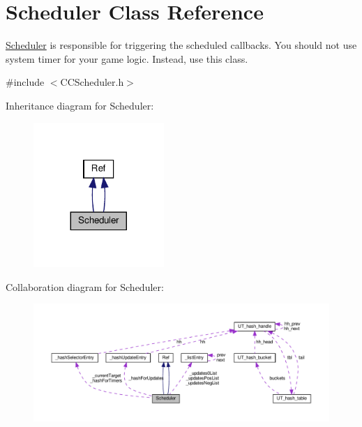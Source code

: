 \hypertarget{classScheduler}{}\section{Scheduler Class Reference}
\label{classScheduler}


\hyperlink{classScheduler}{Scheduler} is responsible for triggering the scheduled callbacks. You should not use system timer for your game logic. Instead, use this class.  




{\ttfamily \#include $<$C\+C\+Scheduler.\+h$>$}



Inheritance diagram for Scheduler\+:
\nopagebreak
\begin{figure}[H]
\begin{center}
\leavevmode
\includegraphics[width=140pt]{classScheduler__inherit__graph}
\end{center}
\end{figure}


Collaboration diagram for Scheduler\+:
\nopagebreak
\begin{figure}[H]
\begin{center}
\leavevmode
\includegraphics[width=350pt]{classScheduler__coll__graph}
\end{center}
\end{figure}
